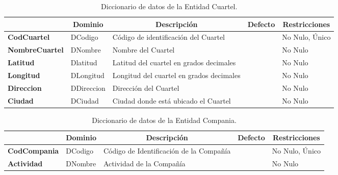 \begin{table}[H]
\centering
\caption{Diccionario de datos de la Entidad Cuartel.}
\label{tab-Dicc-02}
\begin{tabular}{>{\bfseries}m{4.0cm}>{}m{3.0cm}>{}m{6.0cm}>{}m{5.0cm}>{}m{2.0cm}}
\toprule
\multicolumn{1}{c}{\textbf{Atributo}} & \multicolumn{1}{c}{\textbf{Dominio}} & \multicolumn{1}{c}{\textbf{Descripción}} & \multicolumn{1}{c}{\textbf{Defecto}} & \multicolumn{1}{c}{\textbf{Restricciones}} \\ \midrule
CodCuartel	    &   DCodigo	    &   Código de identificación del Cuartel	    &	&No Nulo, Único	\\
NombreCuartel	&   DNombre	    &   Nombre del Cuartel	                        &	&No Nulo	\\
Latitud	        &   Dlatitud	&   Latitud del cuartel en grados decimales	    &	&No Nulo	\\
Longitud	    &   DLongitud	&   Longitud del cuartel en grados decimales	&	&No Nulo	\\
Direccion	    &   DDireccion	&   Dirección del Cuartel	                    &	&No Nulo	\\
Ciudad	        &   DCiudad	    &   Ciudad donde está ubicado el Cuartel	    &	&No Nulo	\\\bottomrule
\end{tabular}
\end{table}

\begin{table}[H]
\centering
\caption{Diccionario de datos de la Entidad Compania.}
\label{tab-Dicc-03}
\begin{tabular}{>{\bfseries}m{4.0cm}>{}m{3.0cm}>{}m{6.0cm}>{}m{5.0cm}>{}m{2.0cm}}
\toprule
\multicolumn{1}{c}{\textbf{Atributo}} & \multicolumn{1}{c}{\textbf{Dominio}} & \multicolumn{1}{c}{\textbf{Descripción}} & \multicolumn{1}{c}{\textbf{Defecto}} & \multicolumn{1}{c}{\textbf{Restricciones}} \\ \midrule
CodCompania	    &   DCodigo	    &   Código de Identificación de la Compañía	        &	&No Nulo, Único	\\
Actividad	&   DNombre	    &   Actividad de la Compañía	                        &	&No Nulo	\\\bottomrule
\end{tabular}
\end{table}

